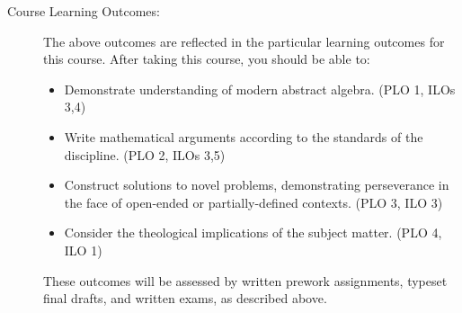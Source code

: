 \documentclass[
  twoside]{article}
\begin{document}
\begin{description}
\item[Course Learning Outcomes:] The above outcomes are reflected in the
     particular learning outcomes for this course.
     After taking this course, you should be able
     to:
    \begin{itemize}
        \item Demonstrate understanding of modern abstract algebra.
             (PLO 1, ILOs 3,4)
        \item Write mathematical arguments according to the
             standards of the discipline. (PLO 2,
              ILOs 3,5)
        \item Construct solutions to novel problems,
               demonstrating perseverance in the face of open-ended or
               partially-defined contexts. (PLO 3, ILO 3)
        \item Consider the theological implications of the subject matter. (PLO 4, ILO 1)
    \end{itemize}
These outcomes will be assessed by written prework assignments, typeset final drafts, and written exams, as described above.

\end{description}
\end{document}
